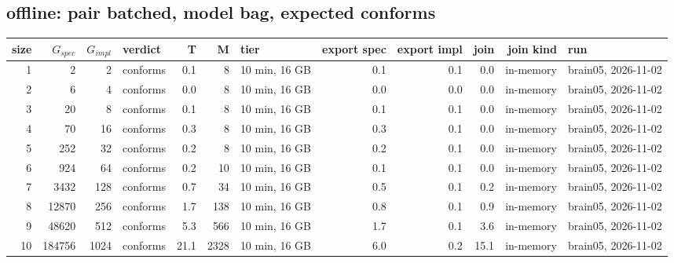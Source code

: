 \documentclass[10pt]{article}
\begin{document}
\subsection*{offline: pair \textsf{batched}, model bag, expected conforms}
\begin{longtable}{@{}rrrlrrlrrrrl@{}}
\toprule
size & $G_{\mathit{spec}}$ & $G_{\mathit{impl}}$ & verdict & T & M & tier & export spec & export impl & join & join kind & run \\
\midrule
\endhead
\color{red} 1 & 2 & 2 & conforms & 0.1 & 8 & 10 min, 16 GB & 0.1 & 0.1 & 0.0 & in-memory & brain05, 2026-11-02 \\
\color{red} 2 & 6 & 4 & conforms & 0.0 & 8 & 10 min, 16 GB & 0.0 & 0.0 & 0.0 & in-memory & brain05, 2026-11-02 \\
\color{red} 3 & 20 & 8 & conforms & 0.1 & 8 & 10 min, 16 GB & 0.1 & 0.1 & 0.0 & in-memory & brain05, 2026-11-02 \\
\color{red} 4 & 70 & 16 & conforms & 0.3 & 8 & 10 min, 16 GB & 0.3 & 0.1 & 0.0 & in-memory & brain05, 2026-11-02 \\
\color{red} 5 & 252 & 32 & conforms & 0.2 & 8 & 10 min, 16 GB & 0.2 & 0.1 & 0.0 & in-memory & brain05, 2026-11-02 \\
\color{red} 6 & 924 & 64 & conforms & 0.2 & 10 & 10 min, 16 GB & 0.1 & 0.1 & 0.0 & in-memory & brain05, 2026-11-02 \\
\color{red} 7 & 3432 & 128 & conforms & 0.7 & 34 & 10 min, 16 GB & 0.5 & 0.1 & 0.2 & in-memory & brain05, 2026-11-02 \\
\color{red} 8 & 12870 & 256 & conforms & 1.7 & 138 & 10 min, 16 GB & 0.8 & 0.1 & 0.9 & in-memory & brain05, 2026-11-02 \\
\color{red} 9 & 48620 & 512 & conforms & 5.3 & 566 & 10 min, 16 GB & 1.7 & 0.1 & 3.6 & in-memory & brain05, 2026-11-02 \\
\color{red} 10 & 184756 & 1024 & conforms & 21.1 & 2328 & 10 min, 16 GB & 6.0 & 0.2 & 15.1 & in-memory & brain05, 2026-11-02 \\
\bottomrule
\end{longtable}
\end{document}
